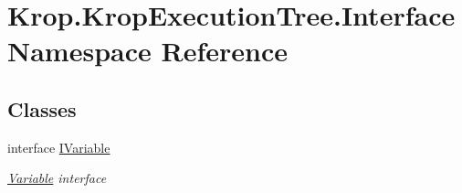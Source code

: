 \hypertarget{namespace_krop_1_1_krop_execution_tree_1_1_interface}{}\section{Krop.\+Krop\+Execution\+Tree.\+Interface Namespace Reference}
\label{namespace_krop_1_1_krop_execution_tree_1_1_interface}
\subsection*{Classes}
\begin{DoxyCompactItemize}
\item 
interface \mbox{\hyperlink{interface_krop_1_1_krop_execution_tree_1_1_interface_1_1_i_variable}{I\+Variable}}
\begin{DoxyCompactList}\small\item\em \mbox{\hyperlink{namespace_krop_1_1_krop_execution_tree_1_1_variable}{Variable}} interface \end{DoxyCompactList}\end{DoxyCompactItemize}
